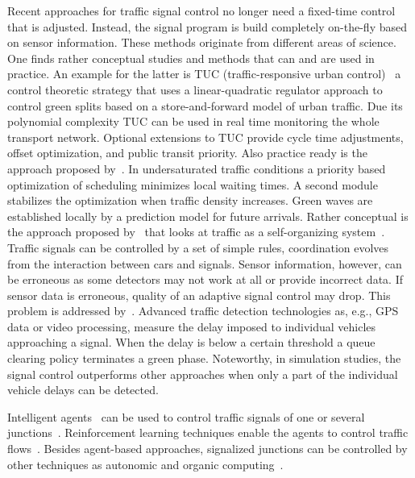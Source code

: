 Recent approaches for traffic signal control no longer need a fixed-time control that is adjusted. 
Instead, the signal program is build completely on-the-fly based on sensor information.  
%
These methods originate from different areas of science. 
One finds rather conceptual studies and methods that can and are used in practice. 
An example for the latter is TUC (traffic-responsive urban control)~\citep{DiakakiPapageorgiouAboudolas2002MultivariableRegulatorTUC,DiakakiEtAl2003ExtensionsTUC,KrausEtAl2010CostEffectiveSignalsTUC,AboudolasEtAl2010RollingHorizonTUC,KouvelasEtAl2011HybridStrategyTUC} a control theoretic strategy that uses a linear-quadratic regulator approach to control green splits based on a store-and-forward model of urban traffic. 
Due its polynomial complexity TUC can be used in real time monitoring the whole transport network. 
Optional extensions to TUC provide cycle time adjustments, offset optimization, and public transit priority.   
Also practice ready is the approach proposed by~\citet{Laemmer2007PhD,LaemmerHelbing2008SelfControlTrafficLights,LaemmerHelbing2010SelfStabilizingSignalControlRealNet}. 
In undersaturated traffic conditions a priority based optimization of scheduling minimizes local waiting times. 
A second module stabilizes the optimization when traffic density increases. 
Green waves are established locally by a prediction model for future arrivals. 
%
Rather conceptual is the approach proposed by~\citet{CoolsEtAl2007SelfOrgSignalsSimulation,GershensonRosenblueth2009SelfOrgSignalsWithCA} that looks at traffic as a self-organizing system~\citep{ElmenreichEtAl2009SelfOrganizingSystemsSurvey}. 
Traffic signals can be controlled by a set of simple rules, coordination evolves from the interaction between cars and signals. 
Sensor information, however, can be erroneous as some detectors may not work at all or provide incorrect data. 
If sensor data is erroneous, quality of an adaptive signal control may drop. 
This problem is addressed by~\citet{OertelWagner2011DelayTimeActuatedSignals}. 
Advanced traffic detection technologies as, e.g., GPS data or video processing, measure the delay imposed to individual vehicles approaching a signal. 
When the delay is below a certain threshold a queue clearing policy terminates a green phase.  
Noteworthy, in simulation studies, the signal control outperforms other approaches when only a part of the individual vehicle delays can be detected. 

Intelligent agents~\citep{RusselNorvig2010ArtificialIntelligence} can be used to control traffic signals of one or several junctions~\citep{Bazzan2005signalAgents}. 
Reinforcement learning techniques enable the agents to control traffic flows~\citep{Bazzan2005signalAgents,BazzanOliveiraSilva2010LearningTrafficSignals,Bazzan2009ReinforcementLearningPrint}.  
Besides agent-based approaches, signalized junctions can be controlled by other techniques as autonomic and organic computing~\citep{Prothmann2010OrganicSignalControl}. 

